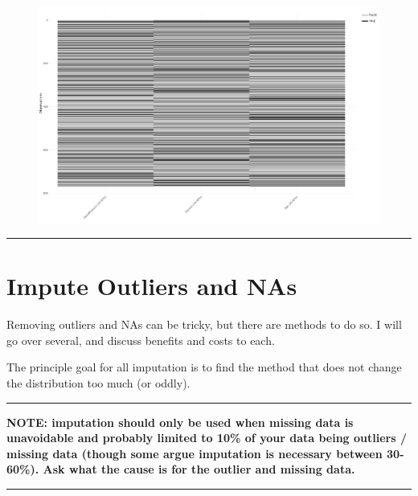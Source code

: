 \documentclass[
  letterpaper,
  DIV=11,
  numbers=noendperiod]{scrreprt}
\begin{document}
\begin{figure}[H]

{\centering \includegraphics{./ImputatingLikeDataScientist_files/figure-pdf/unnamed-chunk-9-1.pdf}

}

\end{figure}

\begin{center}\rule{0.5\linewidth}{0.5pt}\end{center}

\hypertarget{impute-outliers-and-nas}{%
\section{Impute Outliers and NAs}\label{impute-outliers-and-nas}}

Removing outliers and NAs can be tricky, but there are methods to do so.
I will go over several, and discuss benefits and costs to each.

The principle goal for all imputation is to find the method that does
not change the distribution too much (or oddly).

\begin{center}\rule{0.5\linewidth}{0.5pt}\end{center}

\textbf{NOTE: imputation should only be used when missing data is
unavoidable and probably limited to 10\% of your data being outliers /
missing data (though some argue imputation is necessary between
30-60\%). Ask what the cause is for the outlier and missing data.}

\begin{center}\rule{0.5\linewidth}{0.5pt}\end{center}
\end{document}
